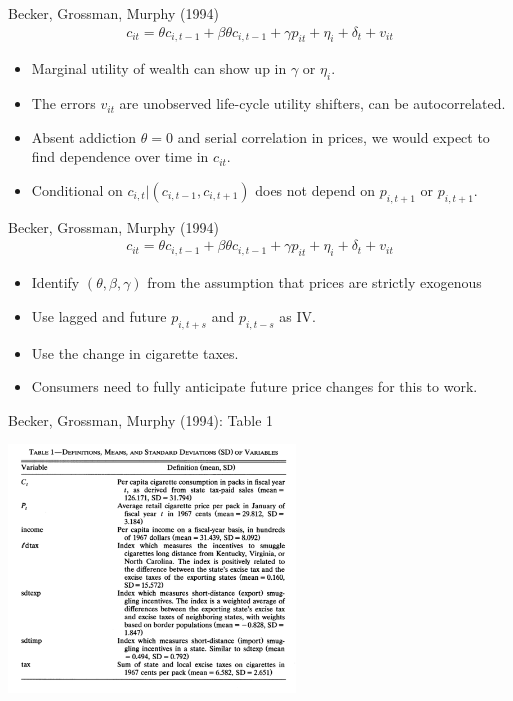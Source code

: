 \documentclass[aspectratio=169]{beamer}
\begin{document}
\begin{frame}{Becker, Grossman, Murphy (1994)}
\begin{align*}
c_{it} = \theta c_{i,t-1} +\beta \theta c_{i,t-1} + \gamma p_{it} + \eta_{i} + \delta_t + v_{it}
\end{align*}
\begin{itemize}
\item Marginal utility of wealth can show up in $\gamma$ or $\eta_i$.
\item The errors $v_{it}$ are unobserved life-cycle utility shifters, can be autocorrelated. 
\item Absent addiction $\theta=0$ and serial correlation in prices, we would expect to find dependence over time in $c_{it}$.
\item Conditional on $c_{i,t}| (c_{i,t-1},c_{i,t+1})$ does not depend on $p_{i,t+1}$ or $p_{i,t+1}$.
\end{itemize}
\end{frame}


\begin{frame}{Becker, Grossman, Murphy (1994)}
\begin{align*}
c_{it} = \theta c_{i,t-1} +\beta \theta c_{i,t-1} + \gamma p_{it} + \eta_{i} + \delta_t + v_{it}
\end{align*}
\begin{itemize}
\item Identify $(\theta,\beta,\gamma)$ from the assumption that prices are strictly exogenous
\item Use lagged and future $p_{i,t+s}$ and $p_{i,t-s}$ as IV. 
\item Use the change in cigarette taxes.
\item Consumers need to fully anticipate \alert{future price changes} for this to work.
\end{itemize}
\end{frame}

\begin{frame}{Becker, Grossman, Murphy (1994): Table 1}
\begin{center}
\includegraphics[width=3in]{./resources/gbm_t1.png}
\end{center}
\end{frame}
\end{document}
